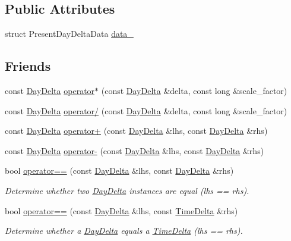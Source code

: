 \subsection*{Public Attributes}
\begin{DoxyCompactItemize}
\item 
struct Present\-Day\-Delta\-Data \hyperlink{structDayDelta_af256f16b6700e43995186eea83db9ebc}{data\-\_\-}
\end{DoxyCompactItemize}
\subsection*{Friends}
\begin{DoxyCompactItemize}
\item 
const \hyperlink{structDayDelta}{Day\-Delta} \hyperlink{structDayDelta_a6adf4f64a2cc331d79aa417debee707d}{operator$\ast$} (const \hyperlink{structDayDelta}{Day\-Delta} \&delta, const long \&scale\-\_\-factor)
\item 
const \hyperlink{structDayDelta}{Day\-Delta} \hyperlink{structDayDelta_a27bd20e8e7c80f368090ab4150dceb12}{operator/} (const \hyperlink{structDayDelta}{Day\-Delta} \&delta, const long \&scale\-\_\-factor)
\item 
const \hyperlink{structDayDelta}{Day\-Delta} \hyperlink{structDayDelta_a371e4babc2d194244a5b4cea3ea66d7e}{operator+} (const \hyperlink{structDayDelta}{Day\-Delta} \&lhs, const \hyperlink{structDayDelta}{Day\-Delta} \&rhs)
\item 
const \hyperlink{structDayDelta}{Day\-Delta} \hyperlink{structDayDelta_a1b59f350f113499fac66fe2f180fca7a}{operator-\/} (const \hyperlink{structDayDelta}{Day\-Delta} \&lhs, const \hyperlink{structDayDelta}{Day\-Delta} \&rhs)
\item 
bool \hyperlink{structDayDelta_a04f6712422789b8ec3f19d3e1789bf4f}{operator==} (const \hyperlink{structDayDelta}{Day\-Delta} \&lhs, const \hyperlink{structDayDelta}{Day\-Delta} \&rhs)
\begin{DoxyCompactList}\small\item\em Determine whether two \hyperlink{structDayDelta}{Day\-Delta} instances are equal (lhs == rhs). \end{DoxyCompactList}\item 
bool \hyperlink{structDayDelta_a2105aa2309b34a2ade619ca0e1603cf9}{operator==} (const \hyperlink{structDayDelta}{Day\-Delta} \&lhs, const \hyperlink{structTimeDelta}{Time\-Delta} \&rhs)
\begin{DoxyCompactList}\small\item\em Determine whether a \hyperlink{structDayDelta}{Day\-Delta} equals a \hyperlink{structTimeDelta}{Time\-Delta} (lhs == rhs). \end{DoxyCompactList}\item 

\end{DoxyCompactItemize}

